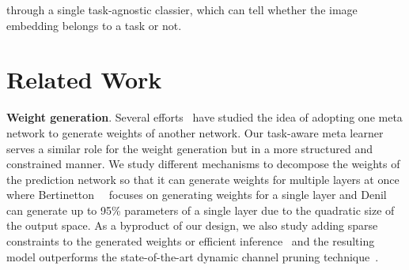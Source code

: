 \documentclass[10pt,twocolumn,letterpaper]{article}
\newcommand\minisection[1]{\vspace{2mm}\noindent \textbf{#1}}
\begin{document}
through a single task-agnostic classier, which can tell whether the image embedding belongs to a task or not.%
\section{Related Work}\minisection{Weight generation}. Several efforts~\cite{bertinetto2016learning, ha2016hypernetworks,denil2013predicting} have studied the idea of adopting one  meta network to generate weights of another network. Our task-aware meta learner serves a similar role for the weight generation 
but in a more structured and constrained manner. We study different mechanisms to decompose the weights of the prediction network so that it can generate weights for multiple layers at once where Bertinetton~\etal~\cite{bertinetto2016learning} 
focuses on generating weights for a single layer and Denil~\etal~\cite{denil2013predicting} can generate up to 95\% parameters of a single layer due to the quadratic size of the output space. As a byproduct of our design, we also study adding sparse constraints to the generated weights or efficient inference~\cite{lin2017runtime, wang2017skipnet, wu2018blockdrop} and the resulting model outperforms the state-of-the-art dynamic channel pruning technique~\cite{lin2017runtime}.
\end{document}
